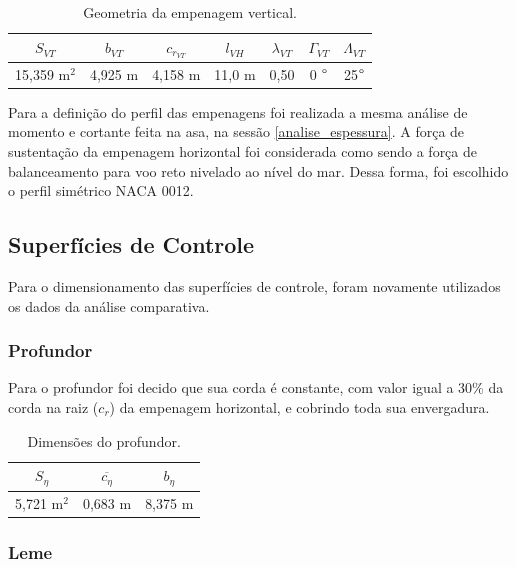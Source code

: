 \begin{table}[H]
    \centering
    \caption{Geometria da empenagem vertical.}
    \begin{tabular}{c c c c c c c}
    \hline
     $S_{VT}$  & $b_{VT}$ & $c_{r_{VT}}$ & $l_{VH}$ & $\lambda_{VT}$ & $\Gamma_{VT}$ & $\Lambda_{VT}$ \\
     \hline
     15,359 m$^2$ & 4,925 m & 4,158 m & 11,0 m & 0,50 & 0 $\degree$ &  25$\degree$ \\
     \hline
    \end{tabular}
    \label{GeoEV_Final}
\end{table}

Para a definição do perfil das empenagens foi realizada a mesma análise de momento e cortante feita na asa, na sessão \ref{analise_espessura}. A força de sustentação da empenagem horizontal foi considerada como sendo a força de balanceamento para voo reto nivelado ao nível do mar. Dessa forma, foi escolhido o perfil simétrico NACA 0012.

\subsection{Superfícies de Controle}

Para o dimensionamento das superfícies de controle, foram novamente utilizados os dados da análise comparativa.

\subsubsection{Profundor}

Para o profundor foi decido que sua corda é constante, com valor igual a 30\% da corda na raiz ($c_r$) da empenagem horizontal, e cobrindo toda sua envergadura.


\begin{table}[H]
    \centering
     \caption{Dimensões do profundor.}
    \begin{tabular}{c c c}
    \hline
     $S_{\eta}$  & $\overline{c_{\eta}}$ & $b_{\eta}$  \\
     \hline
     5,721 m$^2$ & 0,683 m & 8,375 m \\
      \hline
    \end{tabular}
    \label{Profundor_geo}
\end{table}


\subsubsection{Leme}

